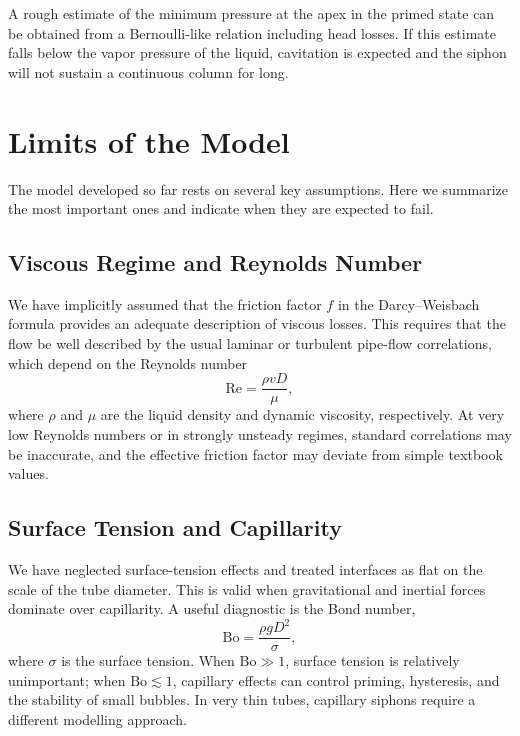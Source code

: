 \documentclass[11pt]{article}
\begin{document}
A rough estimate of the minimum pressure at the apex in the primed state can be obtained from a Bernoulli-like relation including head losses.
If this estimate falls below the vapor pressure of the liquid, cavitation is expected and the siphon will not sustain a continuous column for long.

\section{Limits of the Model}
\label{sec:limits}

The model developed so far rests on several key assumptions.
Here we summarize the most important ones and indicate when they are expected to fail.

\subsection{Viscous Regime and Reynolds Number}

We have implicitly assumed that the friction factor $f$ in the Darcy--Weisbach formula provides an adequate description of viscous losses.
This requires that the flow be well described by the usual laminar or turbulent pipe-flow correlations, which depend on the Reynolds number
\begin{equation}
  \mathrm{Re} = \frac{\rho v D}{\mu},
\end{equation}
where $\rho$ and $\mu$ are the liquid density and dynamic viscosity, respectively.
At very low Reynolds numbers or in strongly unsteady regimes, standard correlations may be inaccurate, and the effective friction factor may deviate from simple textbook values.

\subsection{Surface Tension and Capillarity}

We have neglected surface-tension effects and treated interfaces as flat on the scale of the tube diameter.
This is valid when gravitational and inertial forces dominate over capillarity.
A useful diagnostic is the Bond number,
\begin{equation}
  \mathrm{Bo} = \frac{\rho g D^2}{\sigma},
\end{equation}
where $\sigma$ is the surface tension.
When $\mathrm{Bo} \gg 1$, surface tension is relatively unimportant; when $\mathrm{Bo} \lesssim 1$, capillary effects can control priming, hysteresis, and the stability of small bubbles.
In very thin tubes, capillary siphons require a different modelling approach.
\end{document}
